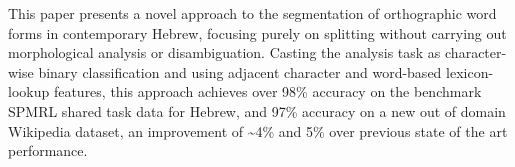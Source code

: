 This paper presents a novel approach to the segmentation of orthographic word forms in contemporary Hebrew, focusing purely on splitting without carrying out morphological analysis or disambiguation. Casting the analysis task as character-wise binary classification and using adjacent character and word-based lexicon-lookup features, this approach achieves over 98\% accuracy on the benchmark SPMRL shared task data for Hebrew, and 97\% accuracy on a new out of domain Wikipedia dataset, an improvement of {\textasciitilde}4\% and 5\% over previous state of the art performance.
